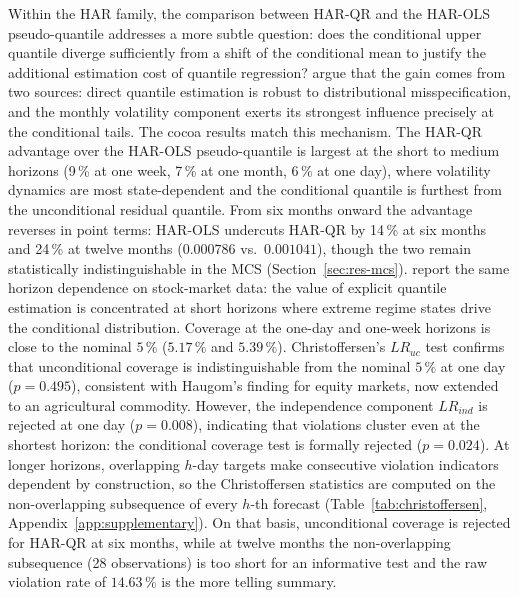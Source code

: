 Within the HAR family, the comparison between HAR-QR and the HAR-OLS
pseudo-quantile addresses a more subtle question: does the conditional upper
quantile diverge sufficiently from a shift of the conditional mean to justify
the additional estimation cost of quantile regression?
\textcite{haugomParsimoniousQuantileRegression2016} argue that the gain comes
from two sources: direct quantile estimation is robust to distributional
misspecification, and the monthly volatility component exerts its strongest
influence precisely at the conditional tails. The cocoa results match this
mechanism. The HAR-QR advantage over the HAR-OLS pseudo-quantile is largest at
the short to medium horizons (9\,\% at one week, 7\,\% at one month, 6\,\% at
one day), where volatility dynamics are most state-dependent and the
conditional quantile is furthest from the unconditional residual quantile.
From six months onward the advantage reverses in point terms: HAR-OLS
undercuts HAR-QR by 14\,\% at six months and 24\,\% at twelve months
($0.000786$ vs.\ $0.001041$), though the two remain statistically
indistinguishable in the MCS (Section~\ref{sec:res-mcs}). \textcite{lyocsaImprovingStockMarket2021} report
the same horizon dependence on stock-market data: the value of explicit
quantile estimation is concentrated at short horizons where extreme regime
states drive the conditional distribution. Coverage at the one-day and
one-week horizons is close to the nominal $5\,\%$ ($5.17\,\%$ and $5.39\,\%$).
Christoffersen's $LR_{uc}$ test confirms that unconditional coverage is
indistinguishable from the nominal $5\,\%$ at one day ($p = 0.495$), consistent
with Haugom's finding for equity markets, now extended to an agricultural
commodity. However, the independence component $LR_{ind}$ is rejected at one
day ($p = 0.008$), indicating that violations cluster even at the shortest
horizon: the conditional coverage test is formally rejected ($p = 0.024$).
At longer horizons, overlapping $h$-day targets make consecutive violation
indicators dependent by construction, so the Christoffersen statistics are
computed on the non-overlapping subsequence of every $h$-th forecast
(Table~\ref{tab:christoffersen}, Appendix~\ref{app:supplementary}). On that
basis, unconditional coverage is rejected for HAR-QR at six months, while at
twelve months the non-overlapping subsequence (28 observations) is too short
for an informative test and the raw violation rate of $14.63\,\%$ is the more
telling summary.

